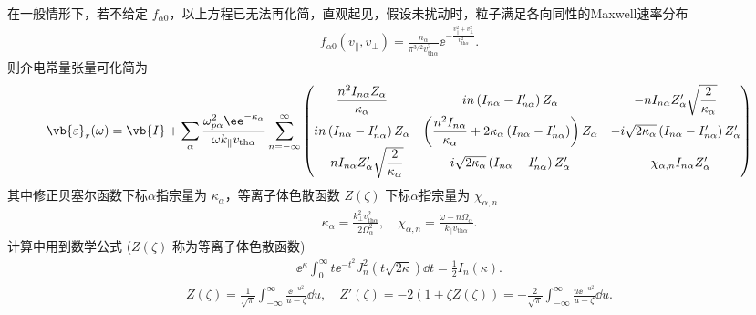 在一般情形下，若不给定 \(f_{\alpha0}\)，以上方程已无法再化简，直观起见，假设未扰动时，粒子满足各向同性的Maxwell速率分布
\begin{align*}
	f_{\alpha0}\left(v_{\parallel},v_\perp\right) = \frac{n_\alpha}{\pi^{3/2}v_{\mathrm{th}\alpha}^3}\ee^{-\frac{v_{\parallel}^2 + v_\perp^2}{v_{\mathrm{th}\alpha}^2}}.
\end{align*}
则介电常量张量可化简为
\begin{align*}
	\vb{\varepsilon}_r(\omega) = \vb{I} + \sum_\alpha\frac{\omega_{p\alpha}^2\ee^{-\kappa_\alpha}}{\omega k_{\parallel}v_{\mathrm{th}\alpha}}
	\sum_{n=-\infty}^{\infty}
	\begin{pmatrix}
		\dfrac{n^2I_{n\alpha}Z_\alpha}{\kappa_\alpha}               & in\left(I_{n\alpha}-I_{n\alpha}^\prime\right)Z_\alpha                                                                & -nI_{n\alpha}Z_\alpha^\prime\sqrt{\dfrac{2}{\kappa_\alpha}}                       \\[6pt]
		in\left(I_{n\alpha}-I_{n\alpha}^\prime\right)Z_\alpha       & \left(\dfrac{n^2I_{n\alpha}}{\kappa_\alpha}+2\kappa_\alpha\left(I_{n\alpha}-I_{n\alpha}^\prime\right)\right)Z_\alpha & -i\sqrt{2\kappa_\alpha}\left(I_{n\alpha}-I_{n\alpha}^\prime\right)Z_\alpha^\prime \\[6pt]
		-nI_{n\alpha}Z_\alpha^\prime\sqrt{\dfrac{2}{\kappa_\alpha}} & i\sqrt{2\kappa_\alpha}\left(I_{n\alpha}-I_{n\alpha}^\prime\right)Z_\alpha^\prime                                     & -\chi_{\alpha,n}I_{n\alpha}Z_\alpha^\prime
	\end{pmatrix}
\end{align*}
其中修正贝塞尔函数下标\(\alpha\)指宗量为 \(\kappa_\alpha\)，等离子体色散函数 \(Z(\zeta)\) 下标\(\alpha\)指宗量为 \(\chi_{\alpha,n}\)
\begin{align*}
	\kappa_\alpha = \frac{k_\perp^2v_{\mathrm{th}\alpha}^2}{2\Omega_\alpha^2}, \quad \chi_{\alpha,n} = \frac{\omega - n\Omega_\alpha}{k_{\parallel}v_{\mathrm{th}\alpha}}.
\end{align*}
计算中用到数学公式 (\(Z(\zeta)\) 称为等离子体色散函数)
\begin{align*}
	\ee^{\kappa}\int_{0}^{\infty}t\ee^{-t^2}J_n^2\left(t\sqrt{2\kappa}\right)\dd t = \frac{1}{2}I_n(\kappa).
\end{align*}
\begin{align*}
	Z(\zeta) = \frac{1}{\sqrt{\pi}}\int_{-\infty}^{\infty}\frac{\ee^{-u^2}}{u-\zeta}\dd u, \quad Z'(\zeta) = -2\left(1+\zeta Z(\zeta)\right) = -\frac{2}{\sqrt{\pi}}\int_{-\infty}^{\infty}\frac{u\ee^{-u^2}}{u-\zeta}\dd u.
\end{align*}

